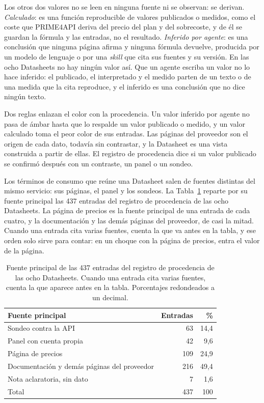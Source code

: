 Los otros dos valores no se leen en ninguna fuente ni se observan: se derivan.
\textit{Calculado}: es una función reproducible de valores publicados o medidos, como el coste que PRIME4API deriva del precio del plan y del sobrecoste, y de él se guardan la fórmula y las entradas, no el resultado.
\textit{Inferido por agente}: es una conclusión que ninguna página afirma y ninguna fórmula devuelve, producida por un modelo de lenguaje o por una \textit{skill} que cita sus fuentes y su versión.
En las ocho Datasheets no hay ningún valor así.
Que un agente escriba un valor no lo hace inferido: el publicado, el interpretado y el medido parten de un texto o de una medida que la cita reproduce, y el inferido es una conclusión que no dice ningún texto.

Dos reglas enlazan el color con la procedencia.
Un valor inferido por agente no pasa de ámbar hasta que lo respalde un valor publicado o medido, y un valor calculado toma el peor color de sus entradas.
Las páginas del proveedor son el origen de cada dato, todavía sin contrastar, y la Datasheet es una vista construida a partir de ellas.
El registro de procedencia dice si un valor publicado se confirmó después con un contraste, un panel o un sondeo.

Los términos de consumo que reúne una Datasheet salen de fuentes distintas del mismo servicio: sus páginas, el panel y los sondeos.
La Tabla~\ref{tab:propuesta:procedencia} reparte por su fuente principal las 437 entradas del registro de procedencia de las ocho Datasheets.
La página de precios es la fuente principal de una entrada de cada cuatro, y la documentación y las demás páginas del proveedor, de casi la mitad.
Cuando una entrada cita varias fuentes, cuenta la que va antes en la tabla, y ese orden solo sirve para contar: en un choque con la página de precios, entra el valor de la página.

\begin{table}[tbp]
\centering
\small
\begin{tabular}{|l|r|r|}
\hline
\textbf{Fuente principal} & \textbf{Entradas} & \textbf{\%} \\
\hline
Sondeo contra la API & 63 & 14,4 \\
Panel con cuenta propia & 42 & 9,6 \\
Página de precios & 109 & 24,9 \\
Documentación y demás páginas del proveedor & 216 & 49,4 \\
Nota aclaratoria, sin dato & 7 & 1,6 \\
\hline
Total & 437 & 100 \\
\hline
\end{tabular}
\caption[Fuente principal de las entradas del registro de procedencia]{Fuente principal de las 437 entradas del registro de procedencia de las ocho Datasheets. Cuando una entrada cita varias fuentes, cuenta la que aparece antes en la tabla. Porcentajes redondeados a un decimal.}
\label{tab:propuesta:procedencia}
\end{table}


